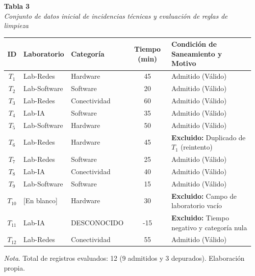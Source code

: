 \documentclass[12pt,a4paper]{article}
\begin{document}
\begin{center}
\small
\noindent\textbf{Tabla 3} \\
\textit{Conjunto de datos inicial de incidencias técnicas y evaluación de reglas de limpieza}
\vspace{4pt}

\begin{tabular}{cllcp{6.2cm}}
    \toprule
    \textbf{ID} & \textbf{Laboratorio} & \textbf{Categoría} & \textbf{Tiempo (min)} & \textbf{Condición de Saneamiento y Motivo} \\
    \midrule
    $T_1$ & Lab-Redes & Hardware & 45 & Admitido (Válido) \\
    $T_2$ & Lab-Software & Software & 20 & Admitido (Válido) \\
    $T_3$ & Lab-Redes & Conectividad & 60 & Admitido (Válido) \\
    $T_4$ & Lab-IA & Software & 35 & Admitido (Válido) \\
    $T_5$ & Lab-Software & Hardware & 50 & Admitido (Válido) \\
    $T_6$ & Lab-Redes & Hardware & 45 & \textbf{Excluido:} Duplicado de $T_1$ (reintento) \\
    $T_7$ & Lab-Redes & Software & 25 & Admitido (Válido) \\
    $T_8$ & Lab-IA & Conectividad & 40 & Admitido (Válido) \\
    $T_9$ & Lab-Software & Software & 15 & Admitido (Válido) \\
    $T_{10}$ & [En blanco] & Hardware & 30 & \textbf{Excluido:} Campo de laboratorio vacío \\
    $T_{11}$ & Lab-IA & DESCONOCIDO & -15 & \textbf{Excluido:} Tiempo negativo y categoría nula \\
    $T_{12}$ & Lab-Redes & Conectividad & 55 & Admitido (Válido) \\
    \bottomrule
\end{tabular}
\vspace{3pt}

\raggedright\footnotesize\textit{Nota}. Total de registros evaluados: 12 (9 admitidos y 3 depurados). Elaboración propia.
\end{center}
\end{document}
